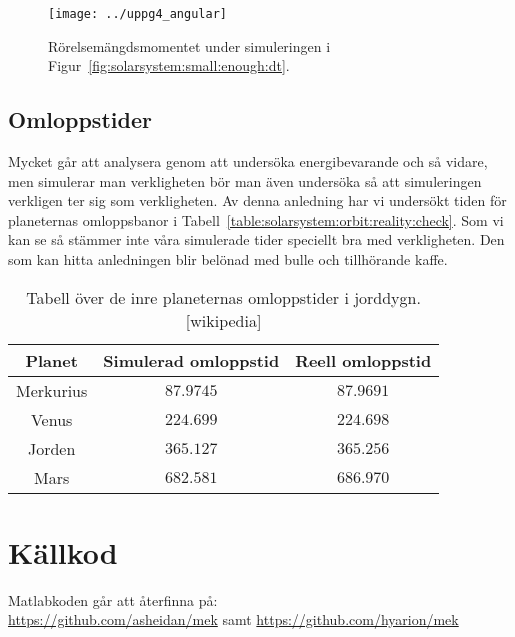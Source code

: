 \documentclass[a4]{article}
\begin{document}
\begin{figure}
\begin{center}
	\texttt{[image: ../uppg4\_angular]}
\end{center}
\caption{Rörelsemängdsmomentet under simuleringen i Figur~\vref{fig:solarsystem:small:enough:dt}.}
\label{fig:solarsystem:angularmomentum}
\end{figure}


		\subsection{Omloppstider}
Mycket går att analysera genom att undersöka energibevarande och så vidare, men
simulerar man verkligheten bör man även undersöka så att simuleringen verkligen
ter sig som verkligheten.
Av denna anledning har vi undersökt tiden för planeternas omloppsbanor i
Tabell~\vref{table:solarsystem:orbit:reality:check}.
Som vi kan se så stämmer inte våra simulerade tider speciellt bra med
verkligheten.
Den som kan hitta anledningen blir belönad med bulle och tillhörande kaffe.

\begin{table}
\begin{center}
\begin{tabular}{c|c|c}
	Planet    & Simulerad omloppstid & Reell omloppstid \\
	\hline
	Merkurius & $87.9745$ &  $87.9691$ \\
	Venus     & $224.699$ &  $224.698$ \\ 
	Jorden    & $365.127$ &  $365.256$ \\
	Mars      & $682.581$ &  $686.970$
\end{tabular}
\caption{
	Tabell över de inre planeternas omloppstider i jorddygn.[wikipedia]
}
\label{table:solarsystem:orbit:reality:check}
\end{center}
\end{table}

\section{Källkod}
	Matlabkoden går att återfinna på:\\
	\url{https://github.com/asheidan/mek} samt
	\url{https://github.com/hyarion/mek}
	
\end{document}

